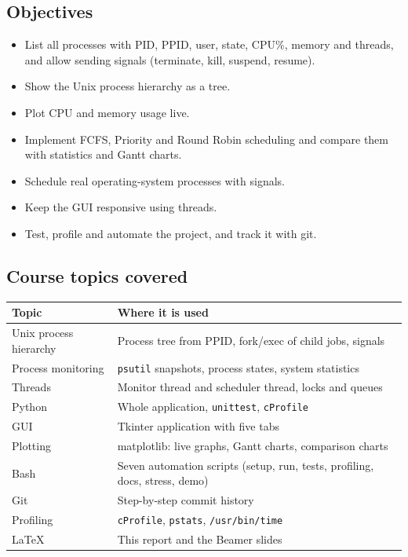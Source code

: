 \documentclass[11pt,a4paper]{article}
\begin{document}
\subsection{Objectives}
\begin{itemize}
  \item List all processes with PID, PPID, user, state, CPU\%, memory and threads, and allow
        sending signals (terminate, kill, suspend, resume).
  \item Show the Unix process hierarchy as a tree.
  \item Plot CPU and memory usage live.
  \item Implement FCFS, Priority and Round Robin scheduling and compare them with statistics and Gantt charts.
  \item Schedule real operating-system processes with signals.
  \item Keep the GUI responsive using threads.
  \item Test, profile and automate the project, and track it with git.
\end{itemize}

\subsection{Course topics covered}
\begin{table}[H]
\centering
\begin{tabular}{lp{10cm}}
\toprule
Topic & Where it is used \\
\midrule
Unix process hierarchy & Process tree from PPID, fork/exec of child jobs, signals \\
Process monitoring & \texttt{psutil} snapshots, process states, system statistics \\
Threads & Monitor thread and scheduler thread, locks and queues \\
Python & Whole application, \texttt{unittest}, \texttt{cProfile} \\
GUI & Tkinter application with five tabs \\
Plotting & matplotlib: live graphs, Gantt charts, comparison charts \\
Bash & Seven automation scripts (setup, run, tests, profiling, docs, stress, demo) \\
Git & Step-by-step commit history \\
Profiling & \texttt{cProfile}, \texttt{pstats}, \texttt{/usr/bin/time} \\
\LaTeX & This report and the Beamer slides \\
\bottomrule
\end{tabular}
\end{table}
\end{document}
